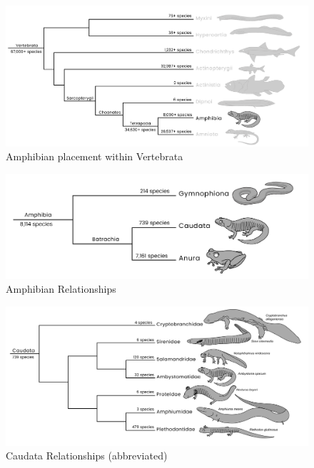 \documentclass[a4paper,12pt]{article}
\begin{document}
%
%

\pagestyle{fancyplain}
\fancyhf{}
\thispagestyle{plain}

\begin{figure}[h]
\centering
  \includegraphics[scale=0.3]{Vertebrata_amphib_tre.pdf}
  \caption{Amphibian placement within Vertebrata}
  \label{fig:Vertebrates2}
\end{figure}

\begin{figure}[h]
\centering
  \includegraphics[scale=0.3]{Amphibia_tre.pdf}
  \caption{Amphibian Relationships}
  \label{fig:Amphibia}
\end{figure}

\begin{figure}[h]
\centering
  \includegraphics[scale=0.3]{Caudata_tre.pdf}
  \caption{Caudata Relationships (abbreviated)}
  \label{fig:Caudata}
\end{figure}
\end{document}

